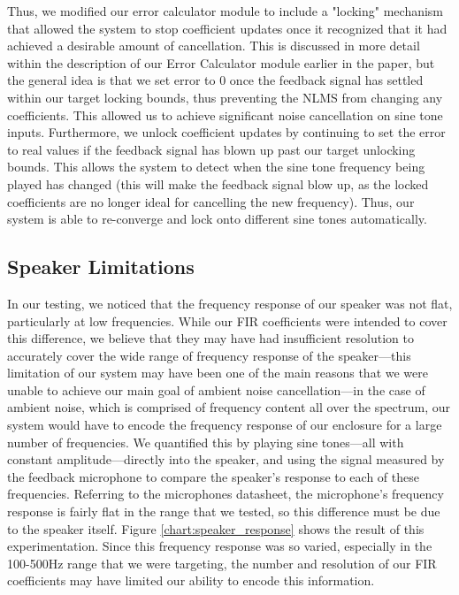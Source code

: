 \documentclass{fpgairpods}
\begin{document}
Thus, we modified our error calculator module to include a "locking" mechanism that allowed the system to stop coefficient updates once it recognized that it had achieved a desirable amount of cancellation. This is discussed in more detail within the description of our Error Calculator module earlier in the paper, but the general idea is that we set error to 0 once the feedback signal has settled within our target locking bounds, thus preventing the NLMS from changing any coefficients. This allowed us to achieve significant noise cancellation on sine tone inputs. Furthermore, we unlock coefficient updates by continuing to set the error to real values if the feedback signal has blown up past our target unlocking bounds. This allows the system to detect when the sine tone frequency being played has changed (this will make the feedback signal blow up, as the locked coefficients are no longer ideal for cancelling the new frequency). Thus, our system is able to re-converge and lock onto different sine tones automatically.

\subsection{Speaker Limitations}
In our testing, we noticed that the frequency response of our speaker was not flat, particularly at low frequencies. While our FIR coefficients were intended to cover this difference, we believe that they may have had insufficient resolution to accurately cover the wide range of frequency response of the speaker---this limitation of our system may have been one of the main reasons that we were unable to achieve our main goal of ambient noise cancellation---in the case of ambient noise, which is comprised of frequency content all over the spectrum, our system would have to encode the frequency response of our enclosure for a large number of frequencies. We quantified this by playing sine tones---all with constant amplitude---directly into the speaker, and using the signal measured by the feedback microphone to compare the speaker's response to each of these frequencies. Referring to the microphones datasheet, the microphone's frequency response is fairly flat in the range that we tested, so this difference must be due to the speaker itself. Figure \ref{chart:speaker_response} shows the result of this experimentation. Since this frequency response was so varied, especially in the 100-500Hz range that we were targeting, the number and resolution of our FIR coefficients may have limited our ability to encode this information. 
\end{document}
